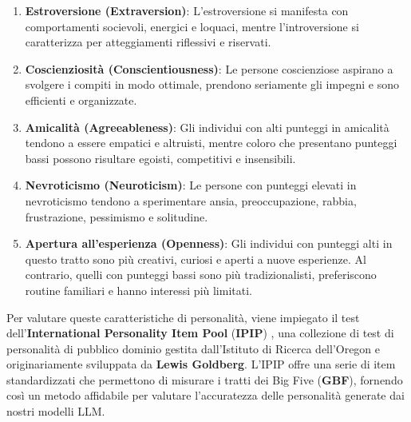 \begin{enumerate}
    \item 
    \textbf{Estroversione (Extraversion)}: 
    L'estroversione si manifesta con comportamenti socievoli, energici e loquaci, mentre l'introversione si caratterizza per atteggiamenti riflessivi e riservati.
    
    \item 
    \textbf{Coscienziosità (Conscientiousness)}:
    Le persone coscienziose aspirano a svolgere i compiti in modo ottimale, prendono seriamente gli impegni e sono efficienti e organizzate.
    
    \item 
    \textbf{Amicalità (Agreeableness)}:
    Gli individui con alti punteggi in amicalità tendono a essere empatici e altruisti, mentre coloro che presentano punteggi bassi possono risultare egoisti, competitivi e insensibili.
    
    \item 
    \textbf{Nevroticismo (Neuroticism)}:
    Le persone con punteggi elevati in nevroticismo tendono a sperimentare ansia, preoccupazione, rabbia, frustrazione, pessimismo e solitudine.
    
    \item 
    \textbf{Apertura all'esperienza (Openness)}:
    Gli individui con punteggi alti in questo tratto sono più creativi, curiosi e aperti a nuove esperienze. Al contrario, quelli con punteggi bassi sono più tradizionalisti, preferiscono routine familiari e hanno interessi più limitati.
\end{enumerate}
Per valutare queste caratteristiche di personalità, viene impiegato il test dell'\textbf{International Personality Item Pool} (\textbf{IPIP}) \cite{goldberg2006}, una collezione di test di personalità di pubblico dominio gestita dall'Istituto di Ricerca dell'Oregon e originariamente sviluppata da \textbf{Lewis Goldberg}. L'IPIP offre una serie di item standardizzati che permettono di misurare i tratti dei Big Five (\textbf{GBF}), fornendo così un metodo affidabile per valutare l'accuratezza delle personalità generate dai nostri modelli LLM. 

